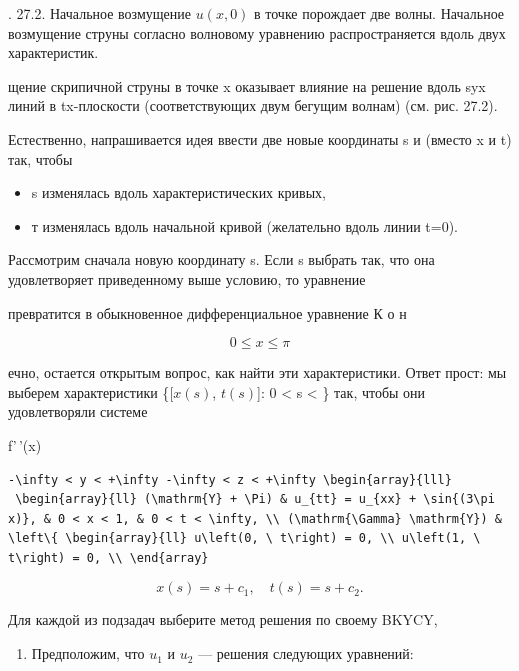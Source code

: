 \documentclass[
  ukrainian,
]{article}
\providecommand{\tightlist}{%
  \setlength{\itemsep}{0pt}\setlength{\parskip}{0pt}}
\begin{document}
. 27.2. Начальное возмущение \(u\left(x,0\right)\) в точке порождает две
волны. Начальное возмущение струны согласно волновому уравнению
распространяется вдоль двух характеристик.

щение скрипичной струны в точке x оказывает влияние на решение вдоль
\partial syx линий в tx-плоскости (соответствующих двум бегущим волнам)
(см. рис. 27.2).

Естественно, напрашивается идея ввести две новые координаты s и
\tau   (вместо x и t) так, чтобы

\begin{itemize}
\tightlist
\item
  s изменялась вдоль характеристических кривых,
\item
  т изменялась вдоль начальной кривой (желательно вдоль линии t=0).
\end{itemize}

Рассмотрим сначала новую координату s. Если s выбрать так, что она
удовлетворяет приведенному выше условию, то уравнение

превратится в обыкновенное дифференциальное уравнение К о н

\[
0 \le x \le \pi
\]

ечно, остается открытым вопрос, как найти эти характеристики. Ответ
прост: мы выберем характеристики \{{[}\(x(s)\), \(t(s)\){]}: 0
\textless{} s \textless{} \infty\} так, чтобы они удовлетворяли системе

f'\,'(x)

\begin{verbatim}
-\infty < y < +\infty -\infty < z < +\infty \begin{array}{lll}
 \begin{array}{ll} (\mathrm{Y} + \Pi) & u_{tt} = u_{xx} + \sin{(3\pi x)}, & 0 < x < 1, & 0 < t < \infty, \\ (\mathrm{\Gamma} \mathrm{Y}) & \left\{ \begin{array}{ll} u\left(0, \ t\right) = 0, \\ u\left(1, \ t\right) = 0, \\ \end{array}
\end{verbatim}

\[
x(s) = s + c_1, \quad t(s) = s + c_2.
\]

Для каждой из подзадач выберите метод решения по своему BKYCY,

\begin{enumerate}
\def\labelenumi{\arabic{enumi}.}
\setcounter{enumi}{2}
\tightlist
\item
  Предположим, что \(u_1\) и \(u_2\) --- решения следующих уравнений:
\end{enumerate}
\end{document}
